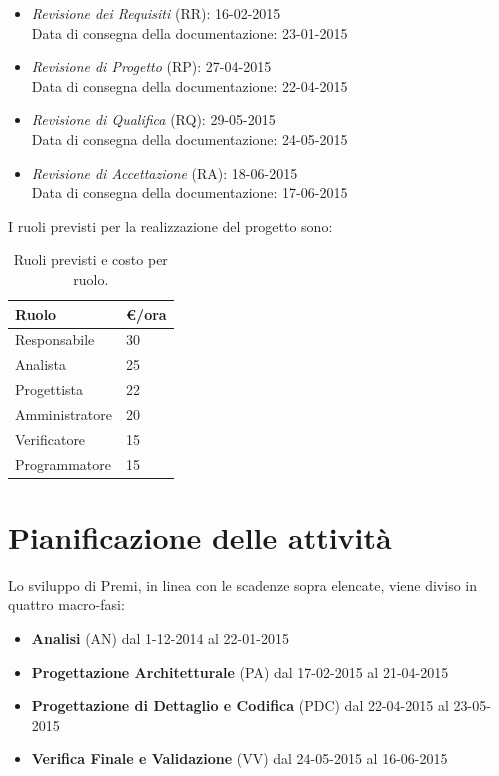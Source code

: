 \begin{itemize}
	\item \textit{Revisione dei Requisiti} (RR): 16-02-2015 \\
	Data di consegna della documentazione: 23-01-2015
	\item \textit{Revisione di Progetto} (RP): 27-04-2015 \\
	Data di consegna della documentazione: 22-04-2015
	\item \textit{Revisione di Qualifica} (RQ): 29-05-2015 \\
	Data di consegna della documentazione: 24-05-2015
	\item \textit{Revisione di Accettazione} (RA): 18-06-2015 \\
	Data di consegna della documentazione: 17-06-2015
\end{itemize}

I ruoli previsti per la realizzazione del progetto sono:

\begin{table}[h]
\begin{center}
\begin{tabular}{|l|l|}
\hline
\textbf{Ruolo} & \textbf{€/ora} \\
\hline
Responsabile & 30 \\
Analista & 25 \\
Progettista & 22 \\
Amministratore & 20 \\
Verificatore & 15 \\
Programmatore & 15 \\
\hline
\end{tabular}
\caption{Ruoli previsti e costo per ruolo.}
\end{center}
\end{table}

\newpage

\section{Pianificazione delle attività}
Lo sviluppo di Premi, in linea con le scadenze sopra elencate, viene diviso in quattro macro-fasi:

\begin{itemize}
\item \textbf{Analisi} (AN) dal 1-12-2014 al 22-01-2015
\item \textbf{Progettazione Architetturale} (PA) dal 17-02-2015 al 21-04-2015
\item \textbf{Progettazione di Dettaglio e Codifica} (PDC) dal 22-04-2015 al 23-05-2015
\item \textbf{Verifica Finale e Validazione} (VV) dal 24-05-2015 al 16-06-2015
\end{itemize}

